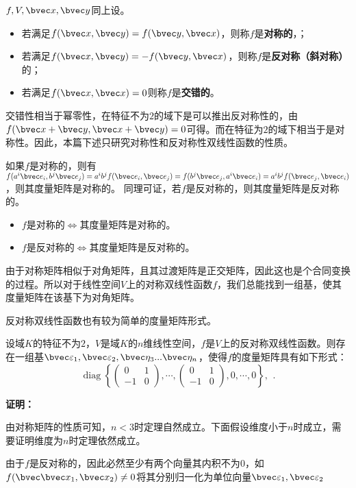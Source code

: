 \begin{definition}{}
$f,V,\bvec x,\bvec y$同上设。
\begin{itemize}
\item 若满足$f(\bvec x,\bvec y)=f(\bvec y,\bvec x)$，则称$f$是\textbf{对称的}，；
\item 若满足$f(\bvec x,\bvec y)=-f(\bvec y,\bvec x)$，则称$f$是\textbf{反对称（斜对称）}的；
\item 若满足$f(\bvec x,\bvec x)=0$则称$f$是\textbf{交错的}。
\end{itemize}
\end{definition}
交错性相当于幂零性，在特征不为$2$的域下是可以推出反对称性的，由$f(\bvec x+\bvec y,\bvec x+\bvec y)=0$可得。而在特征为$2$的域下相当于是对称性。因此，本篇下述只研究对称性和反对称性双线性函数的性质。

如果$f$是对称的，则有$f(a^i\bvec e_i,b^j\bvec e_j)=a^ib^jf(\bvec e_i,\bvec e_j)=f(b^j\bvec e_j,a^i\bvec e_i)=a^ib^jf(\bvec e_j,\bvec e_i)$，则其度量矩阵是对称的。
同理可证，若$f$是反对称的，则其度量矩阵是反对称的。
\begin{itemize}
\item $f$是对称的$\Leftrightarrow$其度量矩阵是对称的。
\item $f$是反对称的$\Leftrightarrow$其度量矩阵是反对称的。
\end{itemize}

由于对称矩阵相似于对角矩阵，且其过渡矩阵是正交矩阵，因此这也是个合同变换的过程。所以对于线性空间$V$上的对称双线性函数$f$，我们总能找到一组基，使其度量矩阵在该基下为对角矩阵。

反对称双线性函数也有较为简单的度量矩阵形式。
\begin{theorem}{}
设域$K$的特征不为$2$，$V$是域$K$的$n$维线性空间，$f$是$V$上的反对称双线性函数。则存在一组基$\bvec \varepsilon_1,\bvec \varepsilon_2,\bvec \eta_3...\bvec \eta_n$，使得$f$的度量矩阵具有如下形式：
\begin{equation}
\operatorname{diag}\left\{\left(\begin{array}{rr}
0 & 1 \\
-1 & 0
\end{array}\right), \cdots,\left(\begin{array}{rr}
0 & 1 \\
-1 & 0
\end{array}\right), 0, \cdots, 0\right\} \text {, }
~.\end{equation}
\end{theorem}
\textbf{证明：}

由对称矩阵的性质可知，$n< 3$时定理自然成立。下面假设维度小于$n$时成立，需要证明维度为$n$时定理依然成立。

由于$f$是反对称的，因此必然至少有两个向量其内积不为$0$，如$f(\bvec \bvec x_1,\bvec x_2)\neq 0$将其分别归一化为单位向量$\bvec \varepsilon_1,\bvec \varepsilon_2$